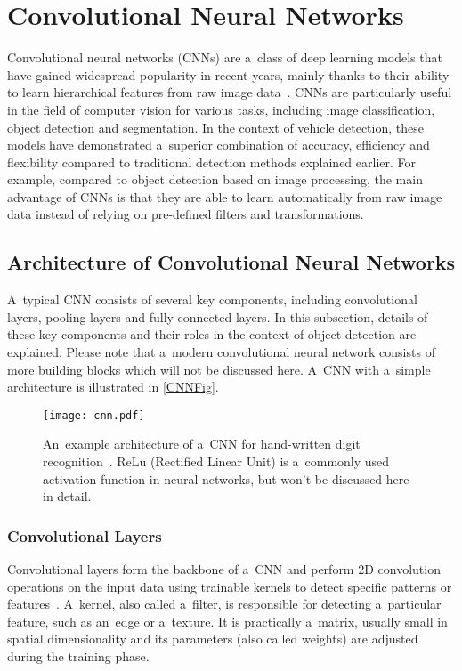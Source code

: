 \section{Convolutional Neural Networks}
\label{CNNs}

Convolutional neural networks (CNNs) are a~class of deep learning models that
have gained widespread popularity in recent years, mainly thanks to their
ability to learn hierarchical features from raw image data~\cite{Li2022}. CNNs
are particularly useful in the field of computer vision for various tasks,
including image classification, object detection and segmentation. In the
context of vehicle detection, these models have demonstrated a~superior
combination of accuracy, efficiency and flexibility compared to traditional
detection methods explained earlier. For example, compared to object detection
based on image processing, the main advantage of CNNs is that they are able to
learn automatically from raw image data instead of relying on pre-defined
filters and transformations.


\subsection{Architecture of Convolutional Neural Networks}

A~typical CNN consists of several key components, including convolutional
layers, pooling layers and fully connected layers. In this subsection, details
of these key components and their roles in the context of object detection are
explained. Please note that a~modern convolutional neural network consists of
more building blocks which will not be discussed here. A~CNN with a~simple
architecture is illustrated in \autoref{CNNFig}.

\begin{figure}[t]
    \centering
    \texttt{[image: cnn.pdf]}
    \captionsetup{width=0.75\textwidth}
    \caption{An~example architecture of a~CNN for hand-written digit
    recognition~\cite{OShea2015}. ReLu (Rectified Linear Unit) is a~commonly
    used activation function in neural networks, but won't be discussed here in
    detail.}
    \label{CNNFig}
\end{figure}


\subsubsection{Convolutional Layers}

Convolutional layers form the backbone of a~CNN and perform 2D convolution
operations on the input data using trainable kernels to detect specific patterns
or features~\cite{OShea2015}. A~kernel, also called a~filter, is responsible
for detecting a~particular feature, such as an~edge or a~texture. It is
practically a~matrix, usually small in spatial dimensionality and its
parameters (also called weights) are adjusted during the training phase.

